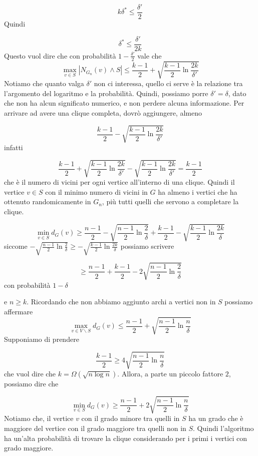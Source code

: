 \documentclass[12pt]{report}
\begin{document}
$$k \delta^* \leq \frac{\delta'}{2}$$
Quindi

$$\delta^* \leq \frac{\delta'}{2k}$$
Questo vuol dire che con probabilità $1-\frac{\delta'}{2}$ vale che 
$$\max_{v \in S} |N_{G_n}(v) \land S| \leq \frac{k-1}{2} + \sqrt{\frac{k-1}{2}\ln{\frac{2k}{\delta'}}}$$
Notiamo che quanto valga $\delta'$ non ci interessa, quello ci serve è la relazione tra l'argomento del logaritmo e la probabilità. Quindi, possiamo porre $\delta' = \delta$, dato che non ha alcun significato numerico, e non perdere alcuna informazione. Per arrivare ad avere una clique completa, dovrò aggiungere, almeno

$$\frac{k-1}{2} -  \sqrt{\frac{k-1}{2}\ln{\frac{2k}{\delta'}}}$$
infatti 

$$\frac{k-1}{2} + \sqrt{\frac{k-1}{2}\ln{\frac{2k}{\delta'}}} -  \sqrt{\frac{k-1}{2}\ln{\frac{2k}{\delta'}}} = \frac{k-1}{2}$$
che è il numero di vicini per ogni vertice all'interno di una clique. Quindi il vertice $v \in S$ con il minimo numero di vicini in $G$ ha almeno i vertici che ha ottenuto randomicamente in $G_n$, più tutti quelli che servono a completare la clique.

$$
\min_{v \in S} d_G(v) \geq \frac{n-1}{2} - \sqrt{\frac{n-1}{2} \ln{\frac{2}{\delta}}} + \frac{k-1}{2} -  \sqrt{\frac{k-1}{2}\ln{\frac{2k}{\delta}}}
$$
siccome $- \sqrt{\frac{n-1}{2} \ln{\frac{2}{\delta}}} \geq - \sqrt{\frac{k-1}{2}\ln{\frac{2k}{\delta}}}$ possiamo scrivere 

$$\geq \frac{n-1}{2} + \frac{k-1}{2} - 2\sqrt{\frac{n-1}{2} \ln{\frac{2}{\delta}}}$$
con probabilità $1- \delta$ \begin{comment}
    perché è $1-\delta$ ???? lui dice che è perché considero entrambe le parti, e ogni parte è $1-\frac{\delta}{2}$ ma allora dovrebbe essere $(1-\frac{\delta}{2})^2$ no?
\end{comment} 
e $n \geq k$.
Ricordando che non abbiamo aggiunto archi a vertici non in $S$ possiamo affermare
$$\max_{v \in V\backslash S} d_G(v) \leq \frac{n-1}{2} + \sqrt{\frac{n-1}{2} \ln{\frac{n}{\delta}}}$$
Supponiamo di prendere 

$$\frac{k-1}{2} \geq 4 \sqrt{\frac{n-1}{2} \ln{\frac{n}{\delta}}}$$
che vuol dire che $k = \Omega(\sqrt{n\log{n}})$. Allora, a parte un piccolo fattore $2$, possiamo dire che

$$\min_{v \in S} d_G(v) \geq \frac{n-1}{2} + 2  \sqrt{\frac{n-1}{2}\ln{\frac{n}{\delta}}}$$
Notiamo che, il vertice $v$ con il grado minore tra quelli in $S$ ha un grado che è maggiore del vertice con il grado maggiore tra quelli non in $S$. Quindi l'algoritmo ha un'alta probabilità di trovare la clique considerando per i primi i vertici con grado maggiore.
\end{document}
